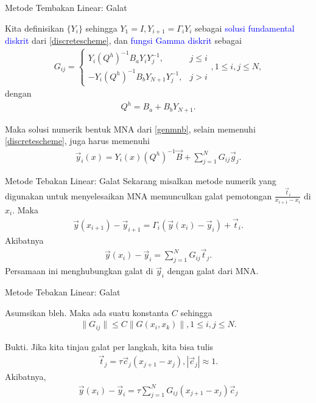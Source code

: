 \documentclass[xcolor={dvipsnames}, 9pt]{beamer}
\renewcommand{\emph}[1]{\textcolor{Blue}{#1}}
\begin{document}
    \begin{frame}{Metode Tembakan Linear: Galat}
        \begin{definition}
        	Kita definisikan $\{Y_i\}$ sehingga $Y_1 = I, Y_{i+1} = \Gamma_iY_i$ sebagai \emph{solusi fundamental diskrit} dari \eqref{discretescheme}, dan \emph{fungsi Gamma diskrit} sebagai
        	\begin{align}\label{fgd}
        		G_{ij} = \begin{cases}
        			Y_i(Q^h)^{-1}B_aY_iY_j^{-1}, & j \leq i \\
        			-Y_i(Q^h)^{-1}B_bY_{N+1}Y_j^{-1}, & j > i
        		\end{cases},
        		1 \leq i, j \leq N,
        	\end{align}
        	dengan
        	\begin{align*}
        		Q^h = B_a + B_bY_{N+1}.
        	\end{align*}
        \end{definition}
        Maka solusi numerik bentuk MNA dari \eqref{genmnb}, selain memenuhi \eqref{discretescheme}, juga harus memenuhi
        \begin{align*}
        	\vec{y}_i(x) = Y_i(x)(Q^h)^{-1}\vec{B} + \sum_{j=1}^{N} G_{ij}\vec{g}_j.
        \end{align*}
    \end{frame}
    \begin{frame}{Metode Tebakan Linear: Galat}
    	Sekarang misalkan metode numerik yang digunakan untuk menyelesaikan MNA memunculkan galat pemotongan $\frac{\vec{t}_i}{x_{i+1}-x_i}$ di $x_i$. Maka
    	\begin{align*}
    		\vec{y}(x_{i+1}) - \vec{y}_{i+1} = \Gamma_i(\vec{y}(x_i)-\vec{y}_i) + \vec{t}_i.
    	\end{align*}
    	Akibatnya
    	\begin{align*}
    		\vec{y}(x_i) - \vec{y}_i = \sum_{j=1}^N G_{ij}\vec{t}_j.
    	\end{align*}
    	Persamaan ini menghubungkan galat di $\vec{y}_i$ dengan galat dari MNA.
    \end{frame}
    \begin{frame}{Metode Tebakan Linear: Galat}
    	\begin{theorem}
    		Asumsikan bleh. Maka ada suatu konstanta $C$ sehingga
    		\begin{align*}
    			\|G_{ij}\| \leq C \|G(x_i,x_k)\|, 1\leq i,j \leq N.
    		\end{align*}
    	\end{theorem}
    	Bukti. \newline 
    	Jika kita tinjau galat per langkah, kita bisa tulis
    	\begin{align*}
    		\vec{t}_j = \tau \vec{c}_j(x_{j+1}-x_j), |\vec{c}_j| \approx 1.
    	\end{align*}
    	Akibatnya,
    	\begin{align*}
    		\vec{y}(x_i) - \vec{y}_i = \tau \sum_{j=1}^{N}G_{ij}(x_{j+1}-x_j)\vec{c}_j
    	\end{align*}
    	
    \end{frame}
\end{document}
